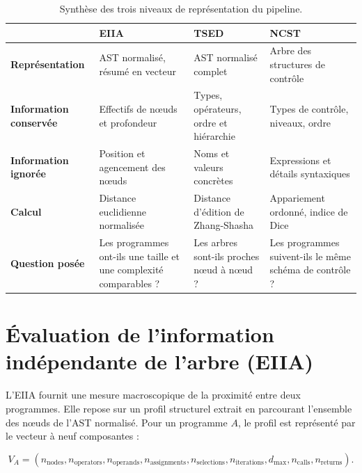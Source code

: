 {\begin{table}[H]
\centering
\small
\renewcommand{\arraystretch}{0.9}
\begin{tabularx}{\textwidth}{>{\bfseries}l X X X}
\toprule
 & \textcolor{cEIIA}{\textbf{EIIA}}
 & \textcolor{cTSED}{\textbf{TSED}}
 & \textcolor{cNCST}{\textbf{NCST}} \\
\midrule
Représentation & AST normalisé, résumé en vecteur
               & AST normalisé complet
               & Arbre des structures de contrôle \\
Information conservée & Effectifs de nœuds et profondeur
               & Types, opérateurs, ordre et hiérarchie
               & Types de contrôle, niveaux, ordre \\
Information ignorée & Position et agencement des nœuds
               & Noms et valeurs concrètes
               & Expressions et détails syntaxiques \\
Calcul & Distance euclidienne normalisée
       & Distance d'édition de Zhang-Shasha
       & Appariement ordonné, indice de Dice \\
Question posée & Les programmes ont-ils une taille et une complexité comparables ?
               & Les arbres sont-ils proches nœud à nœud ?
               & Les programmes suivent-ils le même schéma de contrôle ? \\
\bottomrule
\end{tabularx}
\caption{Synthèse des trois niveaux de représentation du pipeline.}
\label{tab:recap_approches}
\end{table}

\section{Évaluation de l'information indépendante de l'arbre (EIIA)}

L'EIIA fournit une mesure macroscopique de la proximité entre deux
programmes. Elle repose sur un profil structurel extrait en parcourant
l'ensemble des nœuds de l'AST normalisé. Pour un programme $A$, le profil est
représenté par le vecteur à neuf composantes :

\begin{equation}
V_A = (n_{\mathrm{nodes}}, n_{\mathrm{operators}},
n_{\mathrm{operands}}, n_{\mathrm{assignments}}, n_{\mathrm{selections}},
n_{\mathrm{iterations}}, d_{\max}, n_{\mathrm{calls}}, n_{\mathrm{returns}}).
\end{equation}

}
